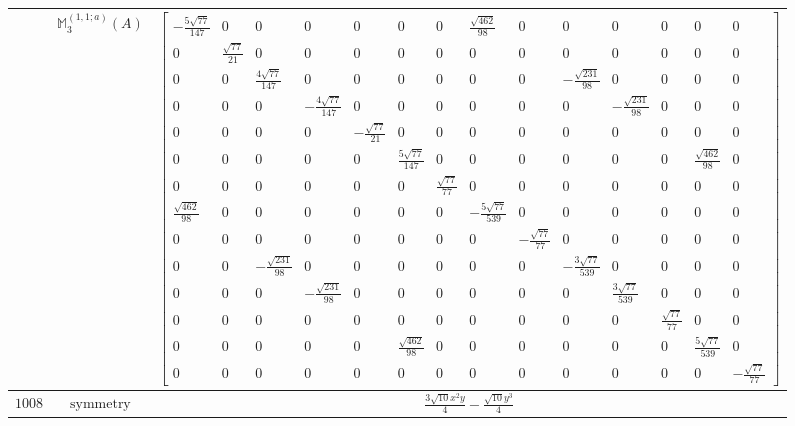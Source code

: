 \documentclass[fleqn,8pt,landscape]{jsarticle}
\begin{document}
\begin{longtable}{ccc}
$  $ & $ \mathbb{M}_{3}^{(1,1;a)}(A) $ & $ \begin{bmatrix} - \frac{5 \sqrt{77}}{147} & 0 & 0 & 0 & 0 & 0 & 0 & \frac{\sqrt{462}}{98} & 0 & 0 & 0 & 0 & 0 & 0 \\ 0 & \frac{\sqrt{77}}{21} & 0 & 0 & 0 & 0 & 0 & 0 & 0 & 0 & 0 & 0 & 0 & 0 \\ 0 & 0 & \frac{4 \sqrt{77}}{147} & 0 & 0 & 0 & 0 & 0 & 0 & - \frac{\sqrt{231}}{98} & 0 & 0 & 0 & 0 \\ 0 & 0 & 0 & - \frac{4 \sqrt{77}}{147} & 0 & 0 & 0 & 0 & 0 & 0 & - \frac{\sqrt{231}}{98} & 0 & 0 & 0 \\ 0 & 0 & 0 & 0 & - \frac{\sqrt{77}}{21} & 0 & 0 & 0 & 0 & 0 & 0 & 0 & 0 & 0 \\ 0 & 0 & 0 & 0 & 0 & \frac{5 \sqrt{77}}{147} & 0 & 0 & 0 & 0 & 0 & 0 & \frac{\sqrt{462}}{98} & 0 \\ 0 & 0 & 0 & 0 & 0 & 0 & \frac{\sqrt{77}}{77} & 0 & 0 & 0 & 0 & 0 & 0 & 0 \\ \frac{\sqrt{462}}{98} & 0 & 0 & 0 & 0 & 0 & 0 & - \frac{5 \sqrt{77}}{539} & 0 & 0 & 0 & 0 & 0 & 0 \\ 0 & 0 & 0 & 0 & 0 & 0 & 0 & 0 & - \frac{\sqrt{77}}{77} & 0 & 0 & 0 & 0 & 0 \\ 0 & 0 & - \frac{\sqrt{231}}{98} & 0 & 0 & 0 & 0 & 0 & 0 & - \frac{3 \sqrt{77}}{539} & 0 & 0 & 0 & 0 \\ 0 & 0 & 0 & - \frac{\sqrt{231}}{98} & 0 & 0 & 0 & 0 & 0 & 0 & \frac{3 \sqrt{77}}{539} & 0 & 0 & 0 \\ 0 & 0 & 0 & 0 & 0 & 0 & 0 & 0 & 0 & 0 & 0 & \frac{\sqrt{77}}{77} & 0 & 0 \\ 0 & 0 & 0 & 0 & 0 & \frac{\sqrt{462}}{98} & 0 & 0 & 0 & 0 & 0 & 0 & \frac{5 \sqrt{77}}{539} & 0 \\ 0 & 0 & 0 & 0 & 0 & 0 & 0 & 0 & 0 & 0 & 0 & 0 & 0 & - \frac{\sqrt{77}}{77} \end{bmatrix} $ \\ \hline
$ 1008 $ & $ \text{symmetry} $ & $ \frac{3 \sqrt{10} x^{2} y}{4} - \frac{\sqrt{10} y^{3}}{4} $ \\

\end{longtable}
\end{document}
